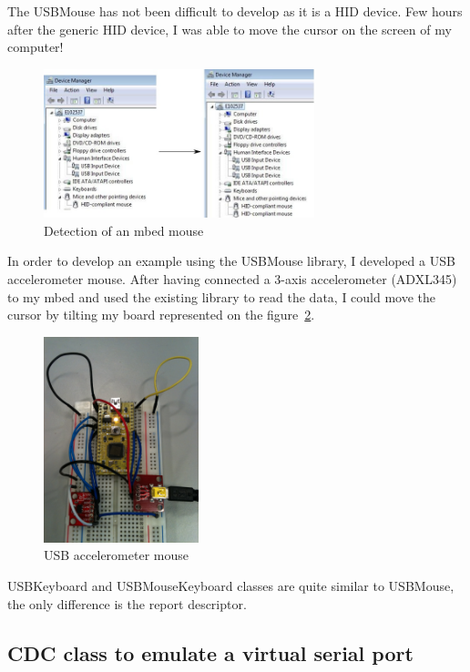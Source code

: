 \documentclass[pdftex,10pt,a4paper]{report}
\begin{document}
The USBMouse has not been difficult to develop as it is a HID device. Few hours after the generic HID device, I was able to move the cursor on the screen of my computer!

\begin{figure}[h!]
		\centering
		\includegraphics[width=0.7\textwidth]{./mouse_dev_manager.jpg}
		\caption{Detection of an mbed mouse}
		\label{Detection of an mbed mouse}
\end{figure}

In order to develop an example using the USBMouse library, I developed a USB accelerometer mouse. After having connected a 3-axis accelerometer (ADXL345) to my mbed and used the existing library to read the data, I could move the cursor by tilting my board represented on the figure~\ref{USB accelerometer mouse}.

\begin{figure}[h!]
		\centering
		\includegraphics[width=0.4\textwidth]{./usb_acc_mouse.jpg}
		\caption{USB accelerometer mouse}
		\label{USB accelerometer mouse}
\end{figure}

USBKeyboard and USBMouseKeyboard classes are quite similar to USBMouse, the only difference is the report descriptor. 


\subsection{CDC class to emulate a virtual serial port}
\end{document}
